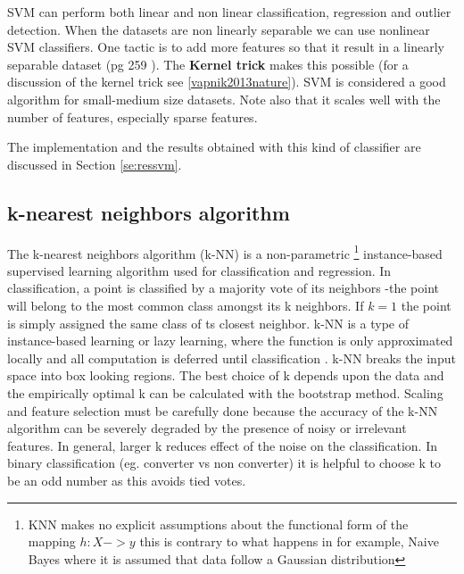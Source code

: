 \documentclass[11pt]{article}
\theoremstyle{definition}
\theoremstyle{remark}
\begin{document}

SVM can perform both linear and non linear classification, regression and outlier detection. When the datasets are non linearly separable we can use nonlinear SVM classifiers. One tactic is to add more features so that it result in a linearly separable dataset (pg 259 \cite{geron2017hands}). The \textbf{Kernel trick} makes this possible (for a discussion of the kernel trick see \ref{vapnik2013nature}). SVM is considered a good algorithm for small-medium size datasets. Note also that it scales well with the number of features, especially sparse features. 

The implementation and the results obtained with this kind of classifier are discussed in Section \ref{se:ressvm}.

\subsection{k-nearest neighbors algorithm}
\label{sse:kneighbors}

The k-nearest neighbors algorithm (k-NN) is a non-parametric \footnote{KNN makes no explicit assumptions about the functional form of the mapping $h:X->y$ this is contrary to what happens in for example, Naive Bayes where it is assumed that data follow a Gaussian distribution} instance-based supervised learning algorithm used for classification and regression. In classification, a point is classified by a majority vote of its neighbors -the point will belong to the most common class amongst its k neighbors. If $k=1$ the point is simply assigned the same class of ts closest neighbor.
k-NN is a type of instance-based learning or lazy learning, where the function is only approximated locally and all computation is deferred until classification \cite{keller1985fuzzy}. k-NN breaks the input space into box looking regions. The best choice of k depends upon the data and the empirically optimal k can be calculated with the bootstrap method. Scaling and feature selection must be carefully done because the accuracy of the k-NN algorithm can be severely degraded by the presence of noisy or irrelevant features. In general, larger k reduces effect of the noise on the classification. In binary classification (eg. converter vs non converter) it is helpful to choose k to be an odd number as this avoids tied votes.
\end{document}
